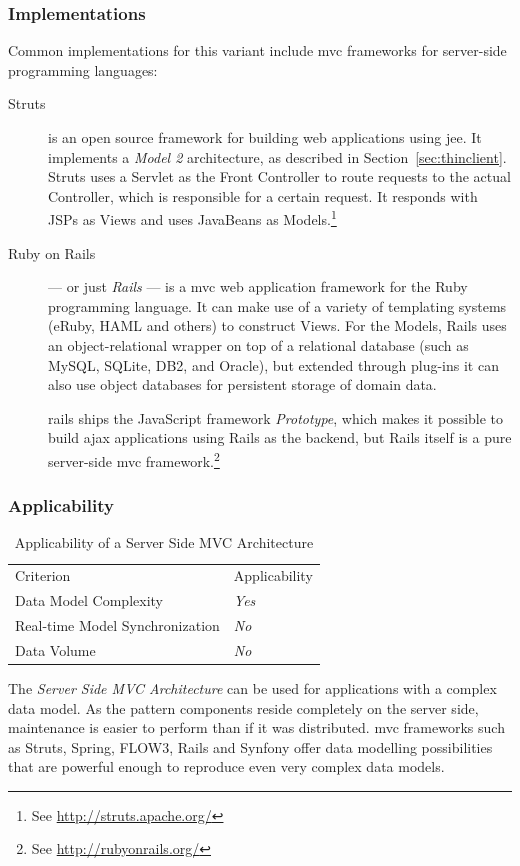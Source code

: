 \subsubsection{Implementations}
Common implementations for this variant include \ac{mvc} frameworks for server-side programming languages:
\begin{description}
  \item[Struts] is an open source framework for building web applications using \ac{jee}. It implements a \emph{Model 2} architecture, as described in Section~\ref{sec:thinclient}. Struts uses a Servlet as the Front Controller to route requests to the actual Controller, which is responsible for a certain request. It responds with JSPs as Views and uses JavaBeans as Models.\footnote{See \url{http://struts.apache.org/}}

	\item[Ruby on Rails]--- or just \emph{Rails} --- is a \ac{mvc} web application framework for the Ruby programming language. It can make use of a variety of templating systems (eRuby, HAML and others) to construct Views. For the Models, Rails uses an object-relational wrapper on top of a relational database (such as MySQL, SQLite, DB2, and Oracle), but extended through plug-ins it can also use object databases for persistent storage of domain data.

	\gls{rails} ships the JavaScript framework \emph{Prototype}, which makes it possible to build \ac{ajax} applications using Rails as the backend, but Rails itself is a pure server-side \ac{mvc} framework.\footnote{See \url{http://rubyonrails.org/}}
\end{description}

\subsubsection{Applicability}
\begin{table}[H]
	\centering
	\begin{tabular}{l l}
\rowcolor{lightgray}
Criterion & Applicability\\
Data Model Complexity & \emph{Yes}\\
Real-time Model Synchronization & \emph{No}\\
Data Volume & \emph{No}\\
	\end{tabular}
	\caption{Applicability of a Server Side MVC Architecture}
\end{table}
The \emph{Server Side MVC Architecture} can be used for applications with a complex data model. As the pattern components reside completely on the server side, maintenance is easier to perform than if it was distributed. \ac{mvc} frameworks such as Struts, Spring, FLOW3, Rails and Synfony offer data modelling possibilities that are powerful enough to reproduce even very complex data models.


